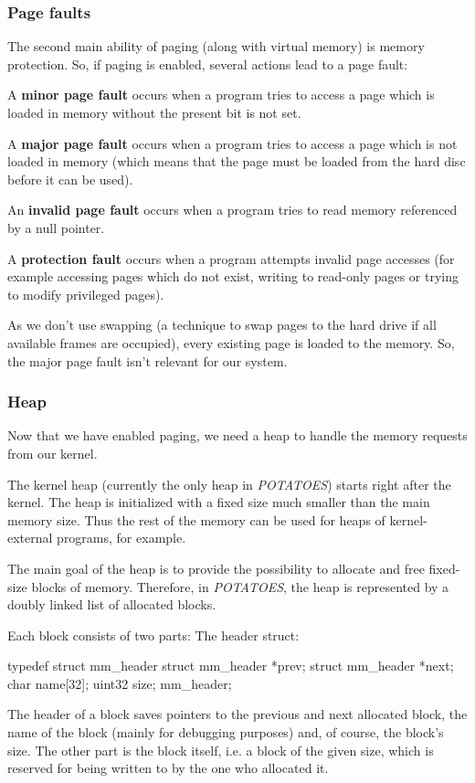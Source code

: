 \documentclass[11pt,a4paper]{scrartcl}
\begin{document}
\subsubsection{Page faults}
The second main ability of paging (along with virtual memory) is memory protection. So, if paging is enabled, several actions lead to a page fault:
\begin{list}{}{}
\item A \textbf{minor page fault} occurs when a program tries to access a page which is loaded in memory without the present bit is not set.
\item A \textbf{major page fault} occurs when a program tries to access a page which is not loaded in memory (which means that the page must be loaded from the hard disc before it can be used).
\item An \textbf{invalid page fault} occurs when a program tries to read memory referenced by a null pointer.
\item A \textbf{protection fault} occurs when a program attempts invalid page accesses (for example accessing pages which do not exist, writing to read-only pages or trying to modify privileged pages).
\end{list}
As we don't use swapping (a technique to swap pages to the hard drive if all available frames are occupied), every existing page is loaded to the memory. So, the major page fault isn't relevant for our system.
\subsubsection{Heap}
Now that we have enabled paging, we need a heap to handle the memory requests from our kernel.

The kernel heap (currently the only heap in \textit{POTATOES}) starts right after the kernel. The heap is initialized with a fixed size much smaller than the main memory size. Thus the rest of the memory can be used for heaps of kernel-external programs, for example.

The main goal of the heap is to provide the possibility to allocate and free fixed-size blocks of memory.
Therefore, in \textit{POTATOES}, the heap is represented by a doubly linked list of allocated blocks.

Each block consists of two parts:
The header struct:
\begin{code}[kernel/mm/mm.h]
typedef struct mm_header {
	struct mm_header *prev;
	struct mm_header *next;
	char name[32];
	uint32 size;
} mm_header;
\end{code}
The header of a block saves pointers to the previous and next allocated block, the name of the block (mainly for debugging purposes) and, of course, the block's size.
The other part is the block itself, i.e. a block of the given size, which is reserved for being written to by the one who allocated it.
\end{document}
